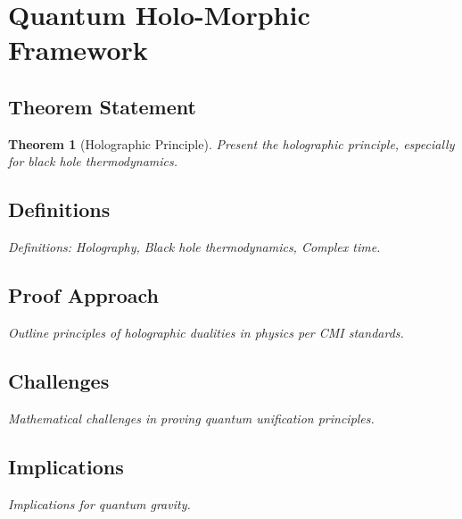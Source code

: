 \documentclass[12pt, a4paper]{article}
\newtheorem{theorem}{Theorem}[section]
\begin{document}

\section{Quantum Holo-Morphic Framework}
\subsection{Theorem Statement}
\begin{theorem}[Holographic Principle]
\label{thm:quantum_holo}
\textit{Present the holographic principle, especially for black hole thermodynamics.}
\end{theorem}

\subsection{Definitions}
\textit{Definitions: Holography, Black hole thermodynamics, Complex time.}

\subsection{Proof Approach}
\textit{Outline principles of holographic dualities in physics per CMI standards.}

\subsection{Challenges}
\textit{Mathematical challenges in proving quantum unification principles.}

\subsection{Implications}
\textit{Implications for quantum gravity.}

\end{document}

